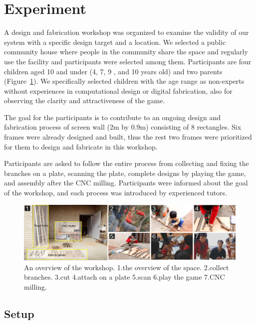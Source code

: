 \section{Experiment}
A design and fabrication workshop was organized to examine the validity of our system with a specific design target and a location.
We selected a public community house where people in the community share the space and regularly use the facility and participants were selected among them.
Participants are four children aged 10 and under (4, 7, 9 , and 10 years old) and two parents (Figure~\ref{fig:workshop}).
We specifically selected children with the age range as non-experts without experiences in computational design or digital fabrication, also for observing the clarity and attractiveness of the game.

The goal for the participants is to contribute to an ongoing design and fabrication process of screen wall (2m by 0.9m) consisting of 8 rectangles.
Six frames were already designed and built, thus the rest two frames were prioritized for them to design and fabricate in this workshop.

Participants are asked to follow the entire process from collecting and fixing the branches on a plate, scanning the plate, complete designs by playing the game, and assembly after the CNC milling.
Participants were informed about the goal of the workshop, and each process was introduced by experienced tutors.

\begin{figure}[ht]
  \begin{center}
    \includegraphics[width = 0.4\paperwidth]{images/fabrication/workshop_setup.png}
    \caption{An overview of the workshop. 1.the overview of the space. 2.collect branches. 3.cut 4.attach on a plate 5.scan 6.play the game 7.CNC milling.}
    \label{fig:workshop}
  \end{center}
\end{figure}

\subsection{Setup}
